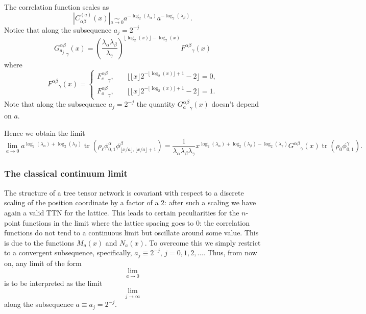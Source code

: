 \documentclass[prl,twocolumn,lengthcheck,superscriptaddress]{revtex4-1}
\newcommand{\tr}{\operatorname{tr}}
\theoremstyle{definition}
\theoremstyle{remark}
\begin{document}
The correlation function scales as
\begin{equation}
	|C_{\alpha\beta}^{(a)}(x)| \underset{a\rightarrow 0}{\sim} a^{-\log_2(\lambda_\alpha)}a^{-\log_2(\lambda_\beta)}.
\end{equation}
Notice that along the subsequence $a_j = 2^{-j}$
\begin{equation}
	{G_{a_j}^{\alpha\beta}}_\gamma(x) = \left(\frac{\lambda_\alpha\lambda_\beta}{\lambda_\gamma}\right)^{\lfloor \log_2(x)\rfloor-\log_2(x) }{F^{\alpha\beta}}_\gamma(x)
\end{equation}
where
\begin{equation}
	{F^{\alpha\beta}}_\gamma(x) =  \begin{cases} {F_e^{\alpha\beta}}_\gamma, &\quad \text{$\lfloor \lfloor x \rfloor 2^{-\lfloor \log_2(x) \rfloor+1} - 2 \rfloor=0$,} \\ 
	{F_o^{\alpha\beta}}_\gamma, &\quad \text{$\lfloor \lfloor x \rfloor 2^{-\lfloor \log_2(x) \rfloor+1} - 2 \rfloor=1$.}\end{cases}
\end{equation}
Note that along the subsequence $a_j= 2^{-j}$ the quantity ${G_{a}^{\alpha\beta}}_\gamma(x)$ doesn't depend on $a$.

Hence we obtain the limit
\begin{equation}
	\lim_{a\rightarrow 0} a^{\log_2(\lambda_\alpha)+ \log_2(\lambda_\beta)}\tr(\rho_{\ell}\phi_{0,1}^{\alpha}\phi_{\lfloor x/a \rfloor,\lfloor x/a \rfloor+1}^{\beta}) = \frac{1}{\lambda_\alpha\lambda_\beta\lambda_\gamma} x^{\log_2(\lambda_\alpha)+\log_2(\lambda_\beta)-\log_2(\lambda_\gamma)}{G^{\alpha\beta}}_\gamma(x)\tr(\rho_{0} \phi_{0,1}^\gamma).
\end{equation}


\subsubsection{The classical continuum limit}
The structure of a tree tensor network is covariant with respect to a discrete scaling of the position coordinate by a factor of a $2$: after such a scaling we have again a valid TTN for the lattice. This leads to certain peculiarities for the $n$-point functions in the limit where the lattice spacing goes to $0$: the correlation functions do not tend to a continuous limit but oscillate around some value. This is due to the functions $M_a(x)$ and $N_a(x)$. To overcome this we simply restrict to a convergent subsequence, specifically, $a_j\equiv 2^{-j}$, $j=0,1,2,\ldots$. Thus, from now on, any limit of the form
\begin{equation}
	\lim_{a\rightarrow 0}
\end{equation}
is to be interpreted as the limit 
\begin{equation}
	\lim_{j\rightarrow \infty}
\end{equation}
along the subsequence $a \equiv a_j = 2^{-j}$.
\end{document}
